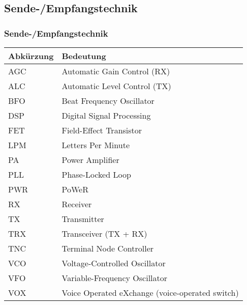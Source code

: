 \subsection*{Sende-/Empfangstechnik}
\begin{frame}
  \frametitle{Sende-/Empfangstechnik}

  \begin{center}
    \footnotesize
    \begin{tabular}{|l|l|}\hline
      \textbf{Abkürzung} & \textbf{Bedeutung}                         \\ \hline \hline
      AGC   & Automatic Gain Control (RX)                             \\ \hline
      ALC   & Automatic Level Control (TX)                            \\ \hline
      BFO   & Beat Frequency Oscillator                               \\ \hline
      DSP   & Digital Signal Processing                               \\ \hline
      FET   & Field-Effect Transistor                                 \\ \hline
      LPM   & Letters Per Minute                                      \\ \hline
      PA    & Power Amplifier                                         \\ \hline
      PLL   & Phase-Locked Loop                                       \\ \hline
      PWR   & PoWeR                                                   \\ \hline
      RX    & Receiver                                                \\ \hline
      TX    & Transmitter                                             \\ \hline
      TRX   & Transceiver (TX + RX)                                   \\ \hline
      TNC   & Terminal Node Controller                                \\ \hline
      VCO   & Voltage-Controlled Oscillator                           \\ \hline
      VFO   & Variable-Frequency Oscillator                           \\ \hline
      VOX   & Voice Operated eXchange (voice-operated switch)         \\ \hline
    \end{tabular}
  \end{center}

\end{frame}

